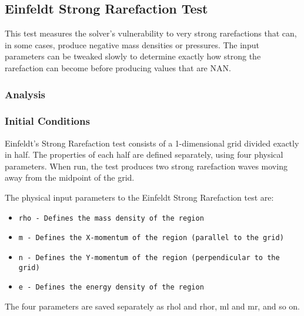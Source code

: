 

\subsection{Einfeldt Strong Rarefaction Test}

This test measures the solver's vulnerability to very strong rarefactions that can, in some cases, 
produce negative mass densities or pressures. The input parameters can be tweaked slowly to determine 
exactly how strong the rarefaction can become before producing values that are NAN. 

\subsubsection{Analysis}

\subsubsection{Initial Conditions}

Einfeldt's Strong Rarefaction test consists of a 1-dimensional grid divided exactly in half. The 
properties of each half are defined separately, using four physical parameters. When run, the test 
produces two strong rarefaction waves moving away from the midpoint of the grid.

The physical input parameters to the Einfeldt Strong Rarefaction test are:
\begin{itemize}
\item \tt{rho} - Defines the mass density of the region
\item \tt{m} - Defines the X-momentum of the region (parallel to the grid)
\item \tt{n} - Defines the Y-momentum of the region (perpendicular to the grid)
\item \tt{e} - Defines the energy density of the region
\end{itemize}

The four parameters are saved separately as rhol and rhor, ml and mr, and so on.
